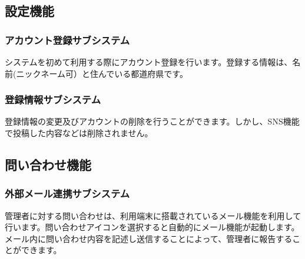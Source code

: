 \documentclass[a4j]{jarticle}
\begin{document}
\subsection{設定機能} 
\subsubsection*{アカウント登録サブシステム} 
システムを初めて利用する際にアカウント登録を行います。登録する情報は、名前(ニックネーム可）と住んでいる都道府県です。 
\subsubsection*{登録情報サブシステム} 
登録情報の変更及びアカウントの削除を行うことができます。しかし、SNS機能で投稿した内容などは削除されません。 

\subsection{問い合わせ機能} 
\subsubsection*{外部メール連携サブシステム} 
管理者に対する問い合わせは、利用端末に搭載されているメール機能を利用して行います。問い合わせアイコンを選択すると自動的にメール機能が起動します。メール内に問い合わせ内容を記述し送信することによって、管理者に報告することができます。 
\end{document}
